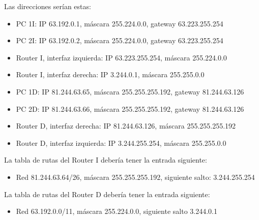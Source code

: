 \documentclass[letterpaper,10pt,spanish]{sphinxmanual}
\begin{document}
\sphinxAtStartPar
Las direcciones serían estas:
\begin{itemize}
\item {} 
\sphinxAtStartPar
PC 1I: IP 63.192.0.1, máscara 255.224.0.0, gateway 63.223.255.254

\item {} 
\sphinxAtStartPar
PC 2I: IP 63.192.0.2, máscara 255.224.0.0, gateway 63.223.255.254

\item {} 
\sphinxAtStartPar
Router I, interfaz izquierda: IP 63.223.255.254, máscara 255.224.0.0

\item {} 
\sphinxAtStartPar
Router I, interfaz derecha: IP 3.244.0.1, máscara 255.255.0.0

\item {} 
\sphinxAtStartPar
PC 1D: IP 81.244.63.65, máscara 255.255.255.192, gateway 81.244.63.126

\item {} 
\sphinxAtStartPar
PC 2D: IP 81.244.63.66, máscara 255.255.255.192, gateway 81.244.63.126

\item {} 
\sphinxAtStartPar
Router D, interfaz derecha: IP 81.244.63.126, máscara 255.255.255.192

\item {} 
\sphinxAtStartPar
Router D, interfaz izquierda: IP 3.244.255.254, máscara 255.255.0.0

\end{itemize}

\sphinxAtStartPar
La tabla de rutas del Router I debería tener la entrada siguiente:
\begin{itemize}
\item {} 
\sphinxAtStartPar
Red 81.244.63.64/26, máscara 255.255.255.192, siguiente salto: 3.244.255.254

\end{itemize}

\sphinxAtStartPar
La tabla de rutas del Router D debería tener la entrada siguiente:
\begin{itemize}
\item {} 
\sphinxAtStartPar
Red 63.192.0.0/11, máscara 255.224.0.0, siguiente salto 3.244.0.1

\end{itemize}
\end{document}
